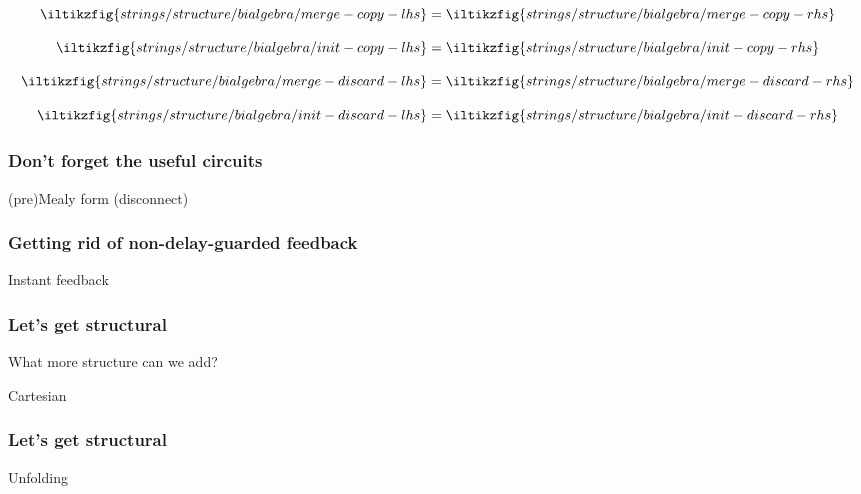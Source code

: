 \begin{frame}
    \begin{minipage}{0.28\textwidth}
        \begin{equation*}
            \iltikzfig{strings/structure/bialgebra/merge-copy-lhs}
            =
            \iltikzfig{strings/structure/bialgebra/merge-copy-rhs}
        \end{equation*}
    \end{minipage}
    \begin{minipage}{0.23\textwidth}
        \begin{equation*}
            \iltikzfig{strings/structure/bialgebra/init-copy-lhs}
            =
            \iltikzfig{strings/structure/bialgebra/init-copy-rhs}
        \end{equation*}
    \end{minipage}
    \begin{minipage}{0.23\textwidth}
        \begin{equation*}
            \iltikzfig{strings/structure/bialgebra/merge-discard-lhs}
            =
            \iltikzfig{strings/structure/bialgebra/merge-discard-rhs}
        \end{equation*}
    \end{minipage}
    \begin{minipage}{0.2\textwidth}
        \begin{equation*}
            \iltikzfig{strings/structure/bialgebra/init-discard-lhs}
            =
            \iltikzfig{strings/structure/bialgebra/init-discard-rhs}
        \end{equation*}
    \end{minipage}
\end{frame}
\begin{frame}
    \frametitle{Don't forget the useful circuits}

    (pre)Mealy form (disconnect)

\end{frame}
\begin{frame}
    \frametitle{Getting rid of non-delay-guarded feedback}

    Instant feedback

\end{frame}
\begin{frame}
    \frametitle{Let's get structural}

    What more structure can we add?

    Cartesian

\end{frame}
\begin{frame}
    \frametitle{Let's get structural}

    Unfolding

\end{frame}
